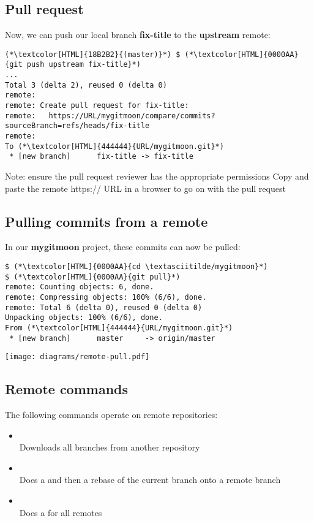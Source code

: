 \subsection{Pull request}
\begin{frame}[fragile]
  \subslidetitle
  Now, we can push our local branch \textbf{fix-title} to the \textbf{upstream} remote:
  \begin{lstlisting}
(*\textcolor[HTML]{18B2B2}{(master)}*) $ (*\textcolor[HTML]{0000AA}{git push upstream fix-title}*)
...
Total 3 (delta 2), reused 0 (delta 0)
remote:
remote: Create pull request for fix-title:
remote:   https://URL/mygitmoon/compare/commits?sourceBranch=refs/heads/fix-title
remote:
To (*\textcolor[HTML]{444444}{URL/mygitmoon.git}*)
 * [new branch]      fix-title -> fix-title
\end{lstlisting}
  Note: ensure the pull request reviewer has the appropriate permissions
  \newline
  Copy and paste the remote https:// URL in a browser to go on with the pull request
\end{frame}

\subsection{Pulling commits from a remote}
\begin{frame}[fragile]
  \subslidetitle
  In our \textbf{mygitmoon} project, these commits can now be pulled:
  \begin{lstlisting}
$ (*\textcolor[HTML]{0000AA}{cd \textasciitilde/mygitmoon}*)
$ (*\textcolor[HTML]{0000AA}{git pull}*)
remote: Counting objects: 6, done.
remote: Compressing objects: 100% (6/6), done.
remote: Total 6 (delta 0), reused 0 (delta 0)
Unpacking objects: 100% (6/6), done.
From (*\textcolor[HTML]{444444}{URL/mygitmoon.git}*)
 * [new branch]      master     -> origin/master
\end{lstlisting}
\center \texttt{[image: diagrams/remote-pull.pdf]}
\end{frame}

\subsection{Remote commands}
\begin{frame}[fragile]
  \subslidetitle
  The following commands operate on remote repositories:
  \begin{itemize}
    \item {} \\
      Downloads all branches from another repository
    \item {} \\
      Does a  and then a {rebase} of the current branch onto a remote branch
    \item {} \\
      Does a  for all remotes
  \end{itemize}
\end{frame}

